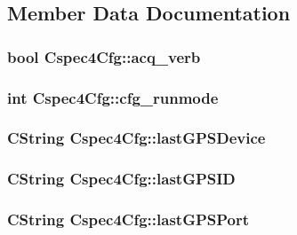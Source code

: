 \subsection{Member Data Documentation}
\hypertarget{classCspec4Cfg_a86ee8e2f8e5e9c4b57e07f98f32ce17a}{
\subsubsection[{acq\_\-verb}]{\setlength{\rightskip}{0pt plus 5cm}bool {\bf Cspec4Cfg::acq\_\-verb}}}
\label{classCspec4Cfg_a86ee8e2f8e5e9c4b57e07f98f32ce17a}
\hypertarget{classCspec4Cfg_a6b9f1d083a116a3c70c0ddf99f511fb6}{
\subsubsection[{cfg\_\-runmode}]{\setlength{\rightskip}{0pt plus 5cm}int {\bf Cspec4Cfg::cfg\_\-runmode}}}
\label{classCspec4Cfg_a6b9f1d083a116a3c70c0ddf99f511fb6}
\hypertarget{classCspec4Cfg_af400c8b8847bc6188f7f6237c14c4777}{
\subsubsection[{lastGPSDevice}]{\setlength{\rightskip}{0pt plus 5cm}CString {\bf Cspec4Cfg::lastGPSDevice}}}
\label{classCspec4Cfg_af400c8b8847bc6188f7f6237c14c4777}
\hypertarget{classCspec4Cfg_a0afb73fbe49d55aa054cd59347325c90}{
\subsubsection[{lastGPSID}]{\setlength{\rightskip}{0pt plus 5cm}CString {\bf Cspec4Cfg::lastGPSID}}}
\label{classCspec4Cfg_a0afb73fbe49d55aa054cd59347325c90}
\hypertarget{classCspec4Cfg_a3ecfa2d568c0fab4e34f5ca94ab0ab28}{
\subsubsection[{lastGPSPort}]{\setlength{\rightskip}{0pt plus 5cm}CString {\bf Cspec4Cfg::lastGPSPort}}}
